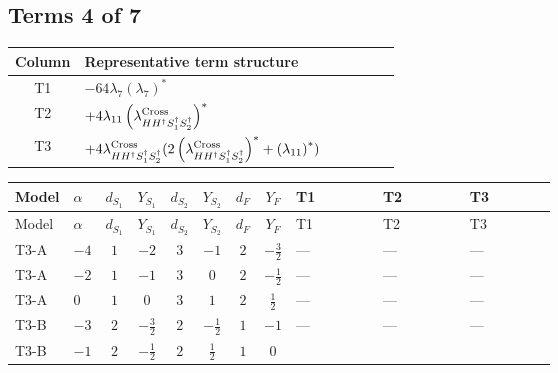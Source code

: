 \documentclass[8pt]{article}
\begin{document}
\begin{landscape}
\subsection*{Terms 4 of 7}
\begin{center}
\begin{tabular}{@{}c >{\raggedright\arraybackslash}p{0.82\linewidth}@{}}
\toprule
Column & Representative term structure \\
\midrule
T1 & \(\displaystyle -64 {\lambda_{7}} \left({\lambda_{7}}\right)^{*}\) \\
\midrule
T2 & \(\displaystyle +4 {\lambda_{11}} \left({\lambda_{H H^\dagger S_1^\dagger S_2^\dagger}^{\rm Cross}}\right)^{*}\) \\
\midrule
T3 & \(\displaystyle +4 {\lambda_{H H^\dagger S_1^\dagger S_2^\dagger}^{\rm Cross}} (2 \left({\lambda_{H H^\dagger S_1^\dagger S_2^\dagger}^{\rm Cross}}\right)^{*}+\left({\lambda_{11}}\right)^{*})\) \\
\midrule
\bottomrule
\end{tabular}
\end{center}
\smallskip
\tiny
\begin{longtable}{@{}llcccccc >{\raggedright\arraybackslash}p{0.21\linewidth} >{\raggedright\arraybackslash}p{0.21\linewidth} >{\raggedright\arraybackslash}p{0.21\linewidth}@{}}
\toprule
Model & $\alpha$ & $d_{S_1}$ & $Y_{S_1}$ & $d_{S_2}$ & $Y_{S_2}$ & $d_F$ & $Y_F$ & T1 & T2 & T3 \\
\midrule
\endfirsthead
\toprule
Model & $\alpha$ & $d_{S_1}$ & $Y_{S_1}$ & $d_{S_2}$ & $Y_{S_2}$ & $d_F$ & $Y_F$ & T1 & T2 & T3 \\
\midrule
\endhead
T3-A & $-4$ & $1$ & $-2$ & $3$ & $-1$ & $2$ & $-\frac{3}{2}$ & --- & --- & --- \\
\midrule
T3-A & $-2$ & $1$ & $-1$ & $3$ & $0$ & $2$ & $-\frac{1}{2}$ & --- & --- & --- \\
\midrule
T3-A & $0$ & $1$ & $0$ & $3$ & $1$ & $2$ & $\frac{1}{2}$ & --- & --- & --- \\
\midrule
T3-B & $-3$ & $2$ & $-\frac{3}{2}$ & $2$ & $-\frac{1}{2}$ & $1$ & $-1$ & --- & --- & --- \\
\midrule
T3-B & $-1$ & $2$ & $-\frac{1}{2}$ & $2$ & $\frac{1}{2}$ & $1$ & $0$ & \scriptsize\adjustbox{max width=\linewidth}{$\begin{gathered} -64 {\lambda_{7}} \left({\lambda_{7}}\right)^{*}\end{gathered}$} & \scriptsize\adjustbox{max width=\linewidth}{$\begin{gathered} +4 {\lambda_{11}} \left({\lambda_{H H^\dagger S_1^\dagger S_2^\dagger}^{\rm Cross}}\right)^{*}\end{gathered}$} & \scriptsize\adjustbox{max width=\linewidth}{$\begin{gathered} +4 {\lambda_{H H^\dagger S_1^\dagger S_2^\dagger}^{\rm Cross}} (2 \left({\lambda_{H H^\dagger S_1^\dagger S_2^\dagger}^{\rm Cross}}\right)^{*}+\left({\lambda_{11}}\right)^{*})\end{gathered}$} \\

\end{longtable}
\end{landscape}
\end{document}
